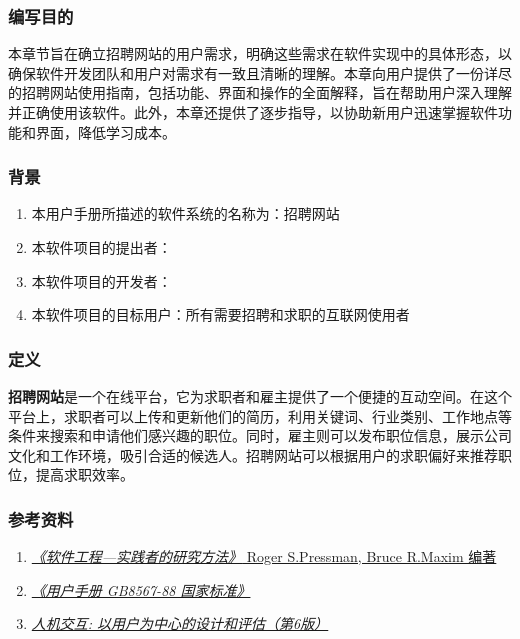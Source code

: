 \documentclass[UTF8,a4paper,10pt]{ctexart}
\begin{document}
\subsubsection{编写目的}

本章节旨在确立招聘网站的用户需求，明确这些需求在软件实现中的具体形态，以确保软件开发团队和用户对需求有一致且清晰的理解。本章向用户提供了一份详尽的招聘网站使用指南，包括功能、界面和操作的全面解释，旨在帮助用户深入理解并正确使用该软件。此外，本章还提供了逐步指导，以协助新用户迅速掌握软件功能和界面，降低学习成本。


\subsubsection{背景}
\begin{enumerate}
    \item 本用户手册所描述的软件系统的名称为：招聘网站 
    \item 本软件项目的提出者：  
    \item 本软件项目的开发者：  
    \item 本软件项目的目标用户：所有需要招聘和求职的互联网使用者 
\end{enumerate}

\subsubsection{定义}
\textbf{招聘网站}是一个在线平台，它为求职者和雇主提供了一个便捷的互动空间。在这个平台上，求职者可以上传和更新他们的简历，利用关键词、行业类别、工作地点等条件来搜索和申请他们感兴趣的职位。同时，雇主则可以发布职位信息，展示公司文化和工作环境，吸引合适的候选人。招聘网站可以根据用户的求职偏好来推荐职位，提高求职效率。

\subsubsection{参考资料}
\begin{enumerate}
    \item  \href{http://images.china-pub.com/ebook40001-45000/41206/ch01.pdf}{\textit{《软件工程—实践者的研究方法》} Roger S.Pressman, Bruce R.Maxim 编著}
    \item \href{https://www.antpedia.com/standard/74250-1.html}{\textit{《用户手册 GB8567-88 国家标准》}}
    \item \href{http://www.tup.tsinghua.edu.cn/booksCenter/book_08468901.html}{\textit{人机交互: 以用户为中心的设计和评估（第6版）}}
\end{enumerate}
\end{document}
